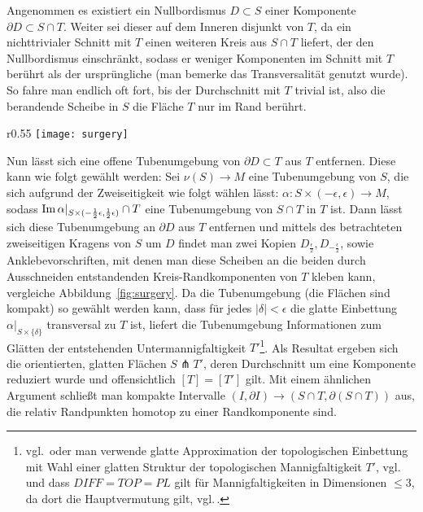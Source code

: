                       
            Angenommen es existiert ein Nullbordismus $D\subset S$ einer Komponente $\partial D \subset S \cap T$. Weiter sei dieser auf dem Inneren disjunkt von $T$, da ein nichttrivialer Schnitt mit $T$ einen weiteren Kreis aus $S\cap T$ liefert, der den Nullbordismus einschränkt, sodass er weniger Komponenten im Schnitt mit $T$ berührt als der ursprüngliche (man bemerke das Transversalität genutzt wurde). So fahre man endlich oft fort, bis der Durchschnitt mit $T$ trivial ist, also die berandende Scheibe in $S$ die Fläche $T$ nur im Rand berührt.
              \begin{wrapfigure}{r}{0.55\textwidth}
                \centering
                \texttt{[image: surgery]}
                \caption{Ausschneiden einer Umgebung von $S\cap T$ und Ankleben zweier Scheiben, sodass die Homologieklasse erhalten bleibt}
                \label{fig:surgery}
            \end{wrapfigure} 
            Nun lässt sich eine offene Tubenumgebung von $\partial D \subset T$ aus $T$ entfernen.
			Diese kann wie folgt gewählt werden: Sei $\nu(S) \to M$ eine Tubenumgebung von $S$, die sich aufgrund der Zweiseitigkeit wie folgt wählen lässt: $\alpha: S \times (-\epsilon,\epsilon) \to M$, sodass $\operatorname{Im}\alpha|_{S\times (-\frac 12\epsilon,\frac 12 \epsilon)} \cap T$ eine Tubenumgebung von $S\cap T $ in $ T$ ist. Dann lässt sich diese Tubenumgebung an $\partial D$ aus $T$ entfernen und mittels des betrachteten zweiseitigen Kragens von $S$ um $D$ findet man zwei Kopien $D_{\frac \epsilon 2}, D_{-\frac \epsilon 2}$, sowie Anklebevorschriften, mit denen man diese Scheiben an die beiden durch Ausschneiden entstandenden Kreis-Randkomponenten von $T$ kleben kann, vergleiche Abbildung~\ref{fig:surgery}. Da die Tubenumgebung (die Flächen sind kompakt) so gewählt werden kann, dass für jedes $|\delta|<\epsilon$ die glatte Einbettung $\alpha|_{S \times \{\delta\}}$ transversal zu $T$ ist, liefert die Tubenumgebung Informationen zum Glätten der entstehenden Untermannigfaltigkeit $T'$\footnote{vgl.\,\cite{WhiteheadJ.H.C..1961} oder man verwende glatte Approximation der topologischen Einbettung mit Wahl einer glatten Struktur der topologischen Mannigfaltigkeit $T'$, vgl.\,\cite[Chapter 5, Lemma 1.5]{Hirsch.1991} und dass $DIFF=TOP=PL$ gilt für Mannigfaltigkeiten in Dimensionen $\le 3$, da dort die Hauptvermutung gilt, vgl.\,\cite[Chapter 35,36]{Moise.1977}.}. Als Resultat ergeben sich die orientierten, glatten Flächen $S \pitchfork T'$, deren Durchschnitt um eine Komponente reduziert wurde und offensichtlich $[T]=[T']$ gilt. Mit einem ähnlichen Argument schließt man kompakte Intervalle $(I,\partial I) \to (S\cap T, \partial(S\cap T))$ aus, die relativ Randpunkten homotop zu einer Randkomponente sind. 

